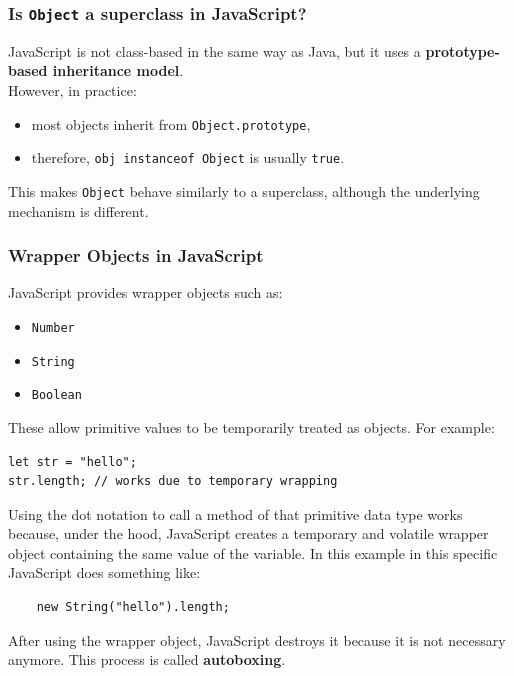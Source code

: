 \documentclass{scrbook}
\begin{document}
\subsubsection{Is \texttt{Object} a superclass in JavaScript?}

JavaScript is not class-based in the same way as Java, but it uses a \textbf{prototype-based inheritance model}.\\

However, in practice:
\begin{itemize}
    \item most objects inherit from \texttt{Object.prototype},
    \item therefore, \texttt{obj instanceof Object} is usually \texttt{true}.
\end{itemize}

This makes \texttt{Object} behave similarly to a superclass, although the underlying mechanism is different.

\subsubsection{Wrapper Objects in JavaScript}

JavaScript provides wrapper objects such as:
\begin{itemize}
    \item \texttt{Number}
    \item \texttt{String}
    \item \texttt{Boolean}
\end{itemize}

These allow primitive values to be temporarily treated as objects. For example:

\begin{lstlisting}
let str = "hello";
str.length; // works due to temporary wrapping
\end{lstlisting}

Using the dot notation to call a method of that primitive data type works because, under the hood, JavaScript creates a temporary and volatile wrapper object containing the same value of the variable. In this example in this specific JavaScript does something like:

\begin{lstlisting}
    new String("hello").length;
\end{lstlisting}

After using the wrapper object, JavaScript destroys it because it is not necessary anymore. This process is called \textbf{autoboxing}.\\
\end{document}
